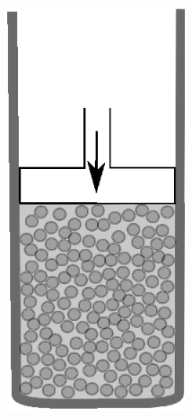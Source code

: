 \documentclass[usenames,dvipsnames]{beamer}
\begin{document}
\begin{frame}
\begin{columns}
\includegraphics[width=0.8\textwidth]{img/proceso/proceso2.eps}



\end{columns}
\end{frame}
\end{document}
